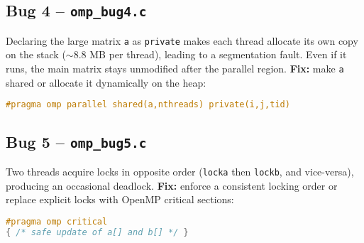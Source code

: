 \subsection*{Bug 4 – \texttt{omp\_bug4.c}}
Declaring the large matrix \texttt{a} as \texttt{private} makes each thread allocate
its own copy on the stack ($\sim$8.8 MB per thread), leading to a segmentation fault.
Even if it runs, the main matrix stays unmodified after the parallel region.  
\textbf{Fix:} make \texttt{a} shared or allocate it dynamically on the heap:
\begin{lstlisting}[language=C]
#pragma omp parallel shared(a,nthreads) private(i,j,tid)
\end{lstlisting}

\subsection*{Bug 5 – \texttt{omp\_bug5.c}}
Two threads acquire locks in opposite order (\texttt{locka} then \texttt{lockb},
and vice-versa), producing an occasional deadlock.  
\textbf{Fix:} enforce a consistent locking order or replace explicit locks with
OpenMP critical sections:
\begin{lstlisting}[language=C]
#pragma omp critical
{ /* safe update of a[] and b[] */ }
\end{lstlisting}